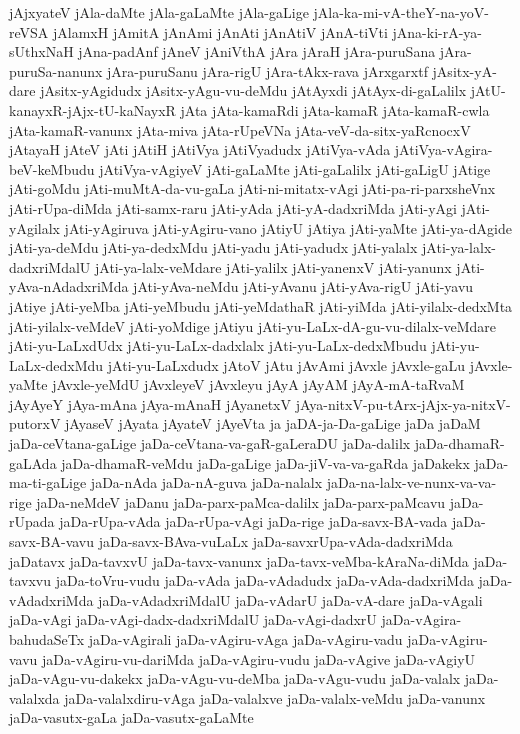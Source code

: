 {jAjxyateV
jAla-daMte
jAla-gaLaMte
jAla-gaLige
jAla-ka-mi-vA-theY-na-yoV-reVSA
jAlamxH
jAmitA
jAnAmi
jAnAti
jAnAtiV
jAnA-tiVti
jAna-ki-rA-ya-sUthxNaH
jAna-padAnf
jAneV
jAniVthA
jAra
jAraH
jAra-puruSana
jAra-puruSa-nanunx
jAra-puruSanu
jAra-rigU
jAra-tAkx-rava
jArxgarxtf
jAsitx-yA-dare
jAsitx-yAgidudx
jAsitx-yAgu-vu-deMdu
jAtAyxdi
jAtAyx-di-gaLalilx
jAtU-kanayxR-jAjx-tU-kaNayxR
jAta
jAta-kamaRdi
jAta-kamaR
jAta-kamaR-cwla
jAta-kamaR-vanunx
jAta-miva
jAta-rUpeVNa
jAta-veV-da-sitx-yaRcnocxV
jAtayaH
jAteV
jAti
jAtiH
jAtiVya
jAtiVyadudx
jAtiVya-vAda
jAtiVya-vAgira-beV-keMbudu
jAtiVya-vAgiyeV
jAti-gaLaMte
jAti-gaLalilx
jAti-gaLigU
jAtige
jAti-goMdu
jAti-muMtA-da-vu-gaLa
jAti-ni-mitatx-vAgi
jAti-pa-ri-parxsheVnx
jAti-rUpa-diMda
jAti-samx-raru
jAti-yAda
jAti-yA-dadxriMda
jAti-yAgi
jAti-yAgilalx
jAti-yAgiruva
jAti-yAgiru-vano
jAtiyU
jAtiya
jAti-yaMte
jAti-ya-dAgide
jAti-ya-deMdu
jAti-ya-dedxMdu
jAti-yadu
jAti-yadudx
jAti-yalalx
jAti-ya-lalx-dadxriMdalU
jAti-ya-lalx-veMdare
jAti-yalilx
jAti-yanenxV
jAti-yanunx
jAti-yAva-nAdadxriMda
jAti-yAva-neMdu
jAti-yAvanu
jAti-yAva-rigU
jAti-yavu
jAtiye
jAti-yeMba
jAti-yeMbudu
jAti-yeMdathaR
jAti-yiMda
jAti-yilalx-dedxMta
jAti-yilalx-veMdeV
jAti-yoMdige
jAtiyu
jAti-yu-LaLx-dA-gu-vu-dilalx-veMdare
jAti-yu-LaLxdUdx
jAti-yu-LaLx-dadxlalx
jAti-yu-LaLx-dedxMbudu
jAti-yu-LaLx-dedxMdu
jAti-yu-LaLxdudx
jAtoV
jAtu
jAvAmi
jAvxle
jAvxle-gaLu
jAvxle-yaMte
jAvxle-yeMdU
jAvxleyeV
jAvxleyu
jAyA
jAyAM
jAyA-mA-taRvaM
jAyAyeY
jAya-mAna
jAya-mAnaH
jAyanetxV
jAya-nitxV-pu-tArx-jAjx-ya-nitxV-putorxV
jAyaseV
jAyata
jAyateV
jAyeVta
ja
jaDA-ja-Da-gaLige
jaDa
jaDaM
jaDa-ceVtana-gaLige
jaDa-ceVtana-va-gaR-gaLeraDU
jaDa-dalilx
jaDa-dhamaR-gaLAda
jaDa-dhamaR-veMdu
jaDa-gaLige
jaDa-jiV-va-va-gaRda
jaDakekx
jaDa-ma-ti-gaLige
jaDa-nAda
jaDa-nA-guva
jaDa-nalalx
jaDa-na-lalx-ve-nunx-va-va-rige
jaDa-neMdeV
jaDanu
jaDa-parx-paMca-dalilx
jaDa-parx-paMcavu
jaDa-rUpada
jaDa-rUpa-vAda
jaDa-rUpa-vAgi
jaDa-rige
jaDa-savx-BA-vada
jaDa-savx-BA-vavu
jaDa-savx-BAva-vuLaLx
jaDa-savxrUpa-vAda-dadxriMda
jaDatavx
jaDa-tavxvU
jaDa-tavx-vanunx
jaDa-tavx-veMba-kAraNa-diMda
jaDa-tavxvu
jaDa-toVru-vudu
jaDa-vAda
jaDa-vAdadudx
jaDa-vAda-dadxriMda
jaDa-vAdadxriMda
jaDa-vAdadxriMdalU
jaDa-vAdarU
jaDa-vA-dare
jaDa-vAgali
jaDa-vAgi
jaDa-vAgi-dadx-dadxriMdalU
jaDa-vAgi-dadxrU
jaDa-vAgira-bahudaSeTx
jaDa-vAgirali
jaDa-vAgiru-vAga
jaDa-vAgiru-vadu
jaDa-vAgiru-vavu
jaDa-vAgiru-vu-dariMda
jaDa-vAgiru-vudu
jaDa-vAgive
jaDa-vAgiyU
jaDa-vAgu-vu-dakekx
jaDa-vAgu-vu-deMba
jaDa-vAgu-vudu
jaDa-valalx
jaDa-valalxda
jaDa-valalxdiru-vAga
jaDa-valalxve
jaDa-valalx-veMdu
jaDa-vanunx
jaDa-vasutx-gaLa
jaDa-vasutx-gaLaMte
}
